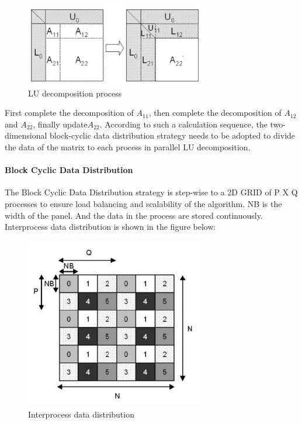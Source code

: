 \documentclass[a4paper,12pt]{article}
\begin{document}
\begin{figure}[H]
    \centering
    \includegraphics[width=0.7\textwidth]{images/algorithm/LU_decomposition_process.png}
    \caption{LU decomposition process}
    \label{fig:lu_decomposition}
\end{figure}

First complete the decomposition of $A_{11}$, then complete the decomposition of $A_{12}$and $A_{22}$, finally update$A_{22}$. According to such a calculation sequence, the two-dimensional block-cyclic data distribution strategy needs to be adopted to divide the data of the matrix to each process in parallel LU decomposition.

\paragraph{Block Cyclic Data Distribution}

The Block Cyclic Data Distribution strategy is step-wise to a 2D GRID of P X Q processes to ensure load balancing and scalability of the algorithm. NB is the width of the panel. And the data in the process are stored continuously. Interprocess data distribution is shown in the figure below:

\begin{figure}[H]
    \centering
    \includegraphics[width=0.7\textwidth]{images/algorithm/Interprocess_data_distribution.png}
    \caption{Interprocess data distribution}
    \label{fig:interprocess_data}
\end{figure}
\end{document}
